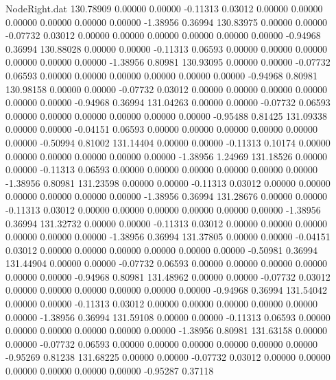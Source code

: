 \begin{filecontents}{NodeRight.dat}
 130.78909    0.00000    0.00000    -0.11313    0.03012    0.00000    0.00000    0.00000    0.00000    0.00000    0.00000   -1.38956    0.36994
 130.83975    0.00000    0.00000    -0.07732    0.03012    0.00000    0.00000    0.00000    0.00000    0.00000    0.00000   -0.94968    0.36994
 130.88028    0.00000    0.00000    -0.11313    0.06593    0.00000    0.00000    0.00000    0.00000    0.00000    0.00000   -1.38956    0.80981
 130.93095    0.00000    0.00000    -0.07732    0.06593    0.00000    0.00000    0.00000    0.00000    0.00000    0.00000   -0.94968    0.80981
 130.98158    0.00000    0.00000    -0.07732    0.03012    0.00000    0.00000    0.00000    0.00000    0.00000    0.00000   -0.94968    0.36994
 131.04263    0.00000    0.00000    -0.07732    0.06593    0.00000    0.00000    0.00000    0.00000    0.00000    0.00000   -0.95488    0.81425
 131.09338    0.00000    0.00000    -0.04151    0.06593    0.00000    0.00000    0.00000    0.00000    0.00000    0.00000   -0.50994    0.81002
 131.14404    0.00000    0.00000    -0.11313    0.10174    0.00000    0.00000    0.00000    0.00000    0.00000    0.00000   -1.38956    1.24969
 131.18526    0.00000    0.00000    -0.11313    0.06593    0.00000    0.00000    0.00000    0.00000    0.00000    0.00000   -1.38956    0.80981
 131.23598    0.00000    0.00000    -0.11313    0.03012    0.00000    0.00000    0.00000    0.00000    0.00000    0.00000   -1.38956    0.36994
 131.28676    0.00000    0.00000    -0.11313    0.03012    0.00000    0.00000    0.00000    0.00000    0.00000    0.00000   -1.38956    0.36994
 131.32732    0.00000    0.00000    -0.11313    0.03012    0.00000    0.00000    0.00000    0.00000    0.00000    0.00000   -1.38956    0.36994
 131.37805    0.00000    0.00000    -0.04151    0.03012    0.00000    0.00000    0.00000    0.00000    0.00000    0.00000   -0.50981    0.36994
 131.44904    0.00000    0.00000    -0.07732    0.06593    0.00000    0.00000    0.00000    0.00000    0.00000    0.00000   -0.94968    0.80981
 131.48962    0.00000    0.00000    -0.07732    0.03012    0.00000    0.00000    0.00000    0.00000    0.00000    0.00000   -0.94968    0.36994
 131.54042    0.00000    0.00000    -0.11313    0.03012    0.00000    0.00000    0.00000    0.00000    0.00000    0.00000   -1.38956    0.36994
 131.59108    0.00000    0.00000    -0.11313    0.06593    0.00000    0.00000    0.00000    0.00000    0.00000    0.00000   -1.38956    0.80981
 131.63158    0.00000    0.00000    -0.07732    0.06593    0.00000    0.00000    0.00000    0.00000    0.00000    0.00000   -0.95269    0.81238
 131.68225    0.00000    0.00000    -0.07732    0.03012    0.00000    0.00000    0.00000    0.00000    0.00000    0.00000   -0.95287    0.37118

\end{filecontents}
